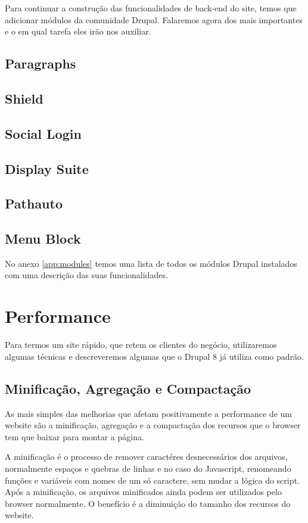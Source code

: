 Para continuar a construção das funcionalidades de back-end do site, temos que adicionar módulos da comunidade Drupal. Falaremos agora dos mais importantes e o em qual tarefa eles irão nos auxiliar.

\subsection{Paragraphs}
\subsection{Shield}
\subsection{Social Login}
\subsection{Display Suite}
\subsection{Pathauto}
\subsection{Menu Block}

No anexo \ref{app:modules} temos uma lista de todos os módulos Drupal instalados com uma descrição das suas funcionalidades.

\section{Performance}

Para termos um site rápido, que retem os clientes do negócio, utilizaremos algumas técnicas e descreveremos algumas que o Drupal 8 já utiliza como padrão.

\subsection{Minificação, Agregação e Compactação}
As mais simples das melhorias que afetam positivamente a performance de um website são a minificação, agregação e a compactação dos recursos que o browser tem que baixar para montar a página. 

A minificação é o processo de remover caractéres desnecessários dos arquivos, normalmente espaços e quebras de linhas e no caso do Javascript, renomeando funções e variáveis com nomes de um só caractere, sem mudar a lógica do script. Após a minificação, os arquivos minificados ainda podem ser utilizados pelo browser normalmente. O benefício é a diminuição do tamanho dos recursos do website.

